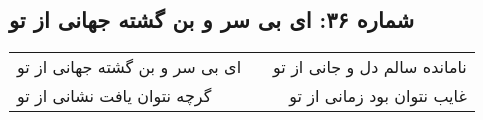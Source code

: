 \begin{center}
\section*{شماره ۳۶: ای بی سر و بن گشته جهانی از تو}
\label{sec:036}
\begin{longtable}{l p{0.5cm} r}
ای بی سر و بن گشته جهانی از تو
&&
نامانده سالم دل و جانی از تو
\\
گرچه نتوان یافت نشانی از تو
&&
غایب نتوان بود زمانی از تو
\\
\end{longtable}
\end{center}
